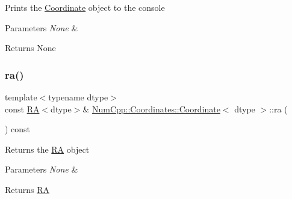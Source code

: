 Prints the \mbox{\hyperlink{class_num_cpp_1_1_coordinates_1_1_coordinate}{Coordinate}} object to the console


\begin{DoxyParams}{Parameters}
{\em None} & \\
\hline
\end{DoxyParams}
\begin{DoxyReturn}{Returns}
None 
\end{DoxyReturn}
\mbox{\label{class_num_cpp_1_1_coordinates_1_1_coordinate_a87ab8065c93fc089e95b43510e3fab94}} 
\subsubsection{\texorpdfstring{ra()}{ra()}}
{\footnotesize\ttfamily template$<$typename dtype$>$ \\
const \mbox{\hyperlink{class_num_cpp_1_1_coordinates_1_1_r_a}{RA}}$<$dtype$>$\& \mbox{\hyperlink{class_num_cpp_1_1_coordinates_1_1_coordinate}{Num\+Cpp\+::\+Coordinates\+::\+Coordinate}}$<$ dtype $>$\+::ra (\begin{DoxyParamCaption}{ }\end{DoxyParamCaption}) const\hspace{0.3cm}{\ttfamily [inline]}}

Returns the \mbox{\hyperlink{class_num_cpp_1_1_coordinates_1_1_r_a}{RA}} object


\begin{DoxyParams}{Parameters}
{\em None} & \\
\hline
\end{DoxyParams}
\begin{DoxyReturn}{Returns}
\mbox{\hyperlink{class_num_cpp_1_1_coordinates_1_1_r_a}{RA}} 
\end{DoxyReturn}
\mbox{\label{class_num_cpp_1_1_coordinates_1_1_coordinate_a8f875954a12c27848e494507bfda4b22}} 
